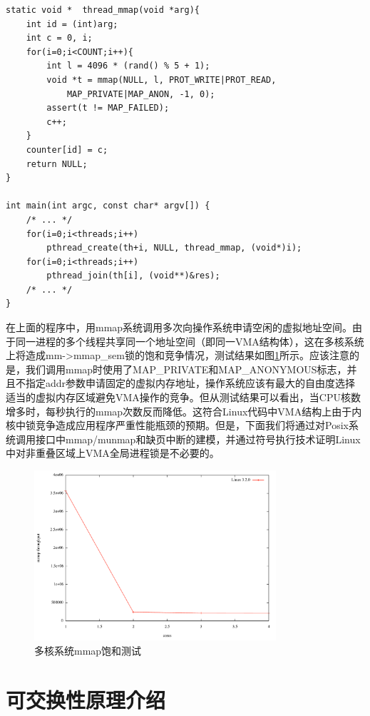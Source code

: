 \begin{lstlisting}
static void *  thread_mmap(void *arg){
	int id = (int)arg;
	int c = 0, i;
	for(i=0;i<COUNT;i++){
		int l = 4096 * (rand() % 5 + 1);
		void *t = mmap(NULL, l, PROT_WRITE|PROT_READ,
			MAP_PRIVATE|MAP_ANON, -1, 0);
		assert(t != MAP_FAILED);
		c++;
	}
	counter[id] = c;
	return NULL;
}

int main(int argc, const char* argv[]) {
	/* ... */
	for(i=0;i<threads;i++)
		pthread_create(th+i, NULL, thread_mmap, (void*)i);
	for(i=0;i<threads;i++)
		pthread_join(th[i], (void**)&res);
	/* ... */
}
\end{lstlisting}

在上面的程序中，用mmap系统调用多次向操作系统申请空闲的虚拟地址空间。由于同一进程的多个线程共享同一个地址空间（即同一VMA结构体），这在多核系统上将造成mm->mmap\_sem锁的饱和竞争情况，测试结果如图\ref{fig:mmap_test}所示。应该注意的是，我们调用mmap时使用了MAP\_PRIVATE和MAP\_ANONYMOUS标志，并且不指定addr参数申请固定的虚拟内存地址，操作系统应该有最大的自由度选择适当的虚拟内存区域避免VMA操作的竞争。但从测试结果可以看出，当CPU核数增多时，每秒执行的mmap次数反而降低。这符合Linux代码中VMA结构上由于内核中锁竞争造成应用程序严重性能瓶颈的预期。但是，下面我们将通过对Posix系统调用接口中mmap/munmap和缺页中断的建模，并通过符号执行技术证明Linux中对非重叠区域上VMA全局进程锁是不必要的。

\begin{figure}[ht]
\begin{center}
\includegraphics[width=0.8\textwidth]{figures/mmap_test.pdf}
\end{center}
\caption{多核系统mmap饱和测试}
\label{fig:mmap_test}
\end{figure}

\section{可交换性原理介绍}

